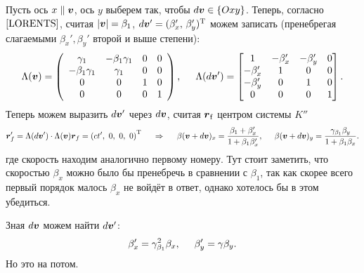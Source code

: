 Пусть ось $x \parallel \mbox{\boldmath $v$}$, ось $y$ выберем так, чтобы $d\mbox{\boldmath $v$} \in \{Oxy\}$. Теперь, согласно $\eqref{LORENTS}$, считая $|\mbox{\boldmath $v$}|=\beta_1$, $d \mbox{\boldmath $v$}' = (\beta_x',\, \beta_y')^{\text{T}}$ можем записать (пренебрегая слагаемыми $\beta_x', \beta_y'$ второй и выше степени):
\begin{equation*}
    \Lambda(\mbox{\boldmath $v$}) =
    \left(
        \begin{array}{cccc}
         \gamma_1 & - \beta_1 \gamma_1 & 0 & 0 \\
         -\beta_1 \gamma_1 & \gamma_1 & 0 & 0 \\
         0 & 0 & 1 & 0 \\
         0 & 0 & 0 & 1 \\
        \end{array}
    \right),
    \hspace{5 mm}
    \Lambda(d \mbox{\boldmath $v$}') = 
\begin{bmatrix}
 1 & -\beta_x' & -\beta_y' & 0 \\
 -\beta_x' & 1 & 0 & 0 \\
 -\beta_y' & 0 & 1 & 0 \\
 0 & 0 & 0 & 1 \\
\end{bmatrix}.
\end{equation*}
Теперь можем выразить $d \mbox{\boldmath $v$}'$ через $d \mbox{\boldmath $v$}$, считая $\mbox{\boldmath $r$}_{\mathrm{f}}$ центром системы $K''$
\begin{equation*}
    \vc{r}_f' = \Lambda(d \vc{v}') \cdot \Lambda(\vc{v}) \vc{r}_f = 
\l(
    c t', \ 0, \ 0, \ 0
\r)\T
\hspace{0.5cm} \Rightarrow \hspace{0.5cm}
\beta(\vc{v}+d \vc{v})_x = \frac{\beta_1 + \beta_x'}{1 + \beta_1 \beta_x'},
\hspace{5 mm}
\beta(\vc{v}+d \vc{v})_y = \frac{\gamma_{\beta_1} \beta_y}{1+\beta_1 \beta_x}.
% 
\end{equation*}
где скорость находим аналогично первому номеру. Тут стоит заметить, что скоростью $\beta_x$ можно было бы пренебречь в сравнении с $\beta_1$, так как скорее всего первый порядок малось $\beta_x$ не войдёт в ответ, однако хотелось бы в этом убедиться.

Зная $d \mbox{\boldmath $v$}$ можем найти $d \mbox{\boldmath $v$}'$:
\begin{equation*}
    \beta_x' = \gamma_{\beta_1}^2 \beta_x,
    \hspace{5 mm}
    \beta_y' = \gamma \beta_y.
\end{equation*}
Но это на потом.

